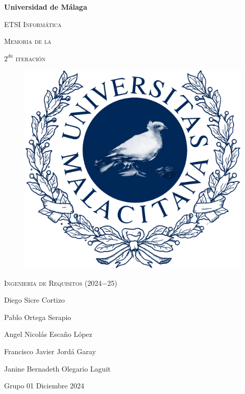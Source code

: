\documentclass[12pt, a4paper, titlepage]{article}
\begin{document}
\begin{titlepage}
  \centering
  {\bfseries\LARGE Universidad de Málaga\par}
  \vspace{1cm}
  {\scshape\Large ETSI Informática\par}
  \vspace{2cm}
  {\scshape\Huge Memoria de la\par}
  \vspace{0.1cm}
  {\scshape\Huge $2^{da}$ iteración}
  \vspace{2cm}
  \begin{figure}[H]
      \centering
       \includegraphics[width=0.30\linewidth]{assets/umaLogo.png}
  \end{figure}
  \vfill
  {\scshape\Large Ingeniería de Requisitos (2024$-$25)\par}
  \vfill
  {\Large Diego Sicre Cortizo\par}
  {\Large Pablo Ortega Serapio\par}
  {\Large Angel Nicolás Escaño López\par}
  {\Large Francisco Javier Jordá Garay\par}
  {\Large Janine Bernadeth Olegario Laguit\par}
  \vspace{1cm}
  {\Large Grupo 01}
  \vfill
  {\Large Diciembre 2024}
\end{titlepage}
\thispagestyle{empty}

\tableofcontents %
\thispagestyle{empty} %

\newpage

\listoffigures %
\thispagestyle{empty}

\newpage
\end{document}
